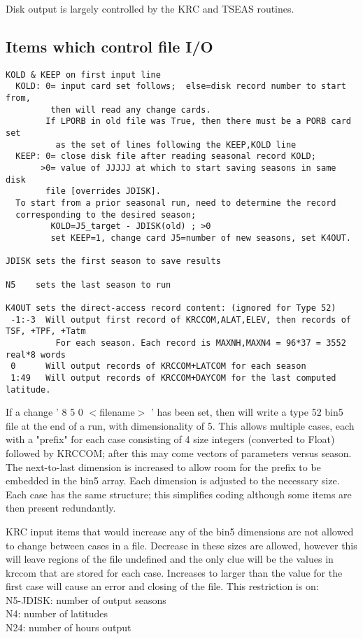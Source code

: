 \documentclass{article}
\newcommand{\qi}{\\ \hspace*{2.em}}      %
\begin{document}
Disk output is largely controlled by the KRC and TSEAS routines.

\subsection{Items which control file I/O } %
\vspace{-3.mm} 
\begin{verbatim}
KOLD & KEEP on first input line
  KOLD: 0= input card set follows;  else=disk record number to start from,
         then will read any change cards.
        If LPORB in old file was True, then there must be a PORB card set 
          as the set of lines following the KEEP,KOLD line
  KEEP: 0= close disk file after reading seasonal record KOLD;
       >0= value of JJJJJ at which to start saving seasons in same disk 
        file [overrides JDISK].
  To start from a prior seasonal run, need to determine the record 
  corresponding to the desired season;
         KOLD=J5_target - JDISK(old) ; >0
         set KEEP=1, change card J5=number of new seasons, set K4OUT.

JDISK sets the first season to save results

N5    sets the last season to run

K4OUT sets the direct-access record content: (ignored for Type 52)
 -1:-3  Will output first record of KRCCOM,ALAT,ELEV, then records of TSF, +TPF, +Tatm
          For each season. Each record is MAXNH,MAXN4 = 96*37 = 3552 real*8 words    
 0      Will output records of KRCCOM+LATCOM for each season
 1:49   Will output records of KRCCOM+DAYCOM for the last computed latitude.
\end{verbatim}

If a change ' 8 5 0 $<$filename$>$ ' has been set, then will write a type 52
bin5 file at the end of a run, with dimensionality of 5. This allows multiple
cases, each with a "prefix" for each case consisting of 4 size integers
(converted to Float) followed by KRCCOM; after this may come vectors of
parameters versus season. The next-to-last dimension is increased to allow room
for the prefix to be embedded in the bin5 array.  Each dimension is adjusted to
the necessary size. Each case has the same structure; this simplifies coding
although some items are then present redundantly.

KRC input items that would increase any of the bin5 dimensions are not allowed
to change between cases in a file. Decrease in these sizes are allowed, however
this will leave regions of the file undefined and the only clue will be the
values in krccom that are stored for each case. Increases to larger than the
value for the first case will cause an error and closing of the file. This
restriction is on:
\qi N5-JDISK: number of output seasons
\qi N4: number of latitudes
\qi N24: number of hours output
\end{document}
